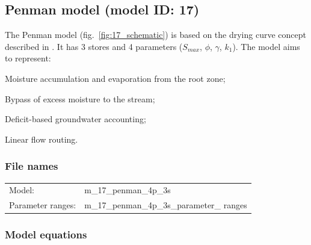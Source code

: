 \subsection{Penman model (model ID: 17)}
The Penman model (fig.~\ref{fig:17_schematic}) is based on the drying curve concept described in \citet{PENMAN1950} \citep{Wagener2002}. It has 3 stores and 4 parameters ($S_{max}$, $\phi$, $\gamma$, $k_1$). The model aims to represent:

\begin{itemizecompact}
\item Moisture accumulation and evaporation from the root zone;
\item Bypass of excess moisture to the stream;
\item Deficit-based groundwater accounting;
\item Linear flow routing.
\end{itemizecompact}

\subsubsection{File names}
\begin{tabular}{@{}ll}
Model: &m\_17\_penman\_4p\_3s \\
Parameter ranges: &m\_17\_penman\_4p\_3s\_parameter\_ ranges \\
\end{tabular}

\subsubsection{Model equations}

